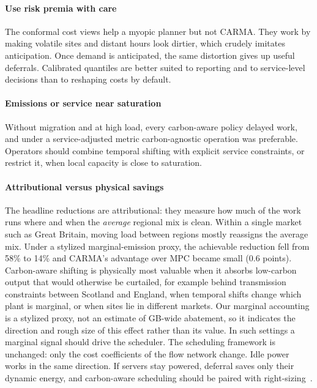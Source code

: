 \paragraph{Use risk premia with care} The conformal cost views help a myopic planner but not CARMA. They work by making volatile sites and distant hours look dirtier, which crudely imitates anticipation. Once demand is anticipated, the same distortion gives up useful deferrals. Calibrated quantiles are better suited to reporting and to service-level decisions than to reshaping costs by default.

\paragraph{Emissions or service near saturation} Without migration and at high load, every carbon-aware policy delayed work, and under a service-adjusted metric carbon-agnostic operation was preferable. Operators should combine temporal shifting with explicit service constraints, or restrict it, when local capacity is close to saturation.

\paragraph{Attributional versus physical savings} The headline reductions are attributional: they measure how much of the work runs where and when the \emph{average} regional mix is clean. Within a single market such as Great Britain, moving load between regions mostly reassigns the average mix. Under a stylized marginal-emission proxy, the achievable reduction fell from 58\% to 14\% and CARMA's advantage over MPC became small (0.6 points). Carbon-aware shifting is physically most valuable when it absorbs low-carbon output that would otherwise be curtailed, for example behind transmission constraints between Scotland and England, when temporal shifts change which plant is marginal, or when sites lie in different markets. Our marginal accounting is a stylized proxy, not an estimate of GB-wide abatement, so it indicates the direction and rough size of this effect rather than its value. In such settings a marginal signal should drive the scheduler. The scheduling framework is unchanged: only the cost coefficients of the flow network change. Idle power works in the same direction. If servers stay powered, deferral saves only their dynamic energy, and carbon-aware scheduling should be paired with right-sizing~\cite{lin2013dynamic}.

